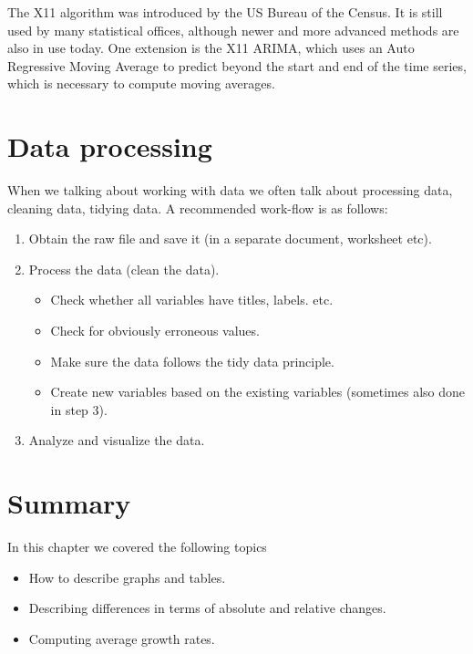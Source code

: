\documentclass[]{book}
\providecommand{\tightlist}{%
  \setlength{\itemsep}{0pt}\setlength{\parskip}{0pt}}
\begin{document}
The X11 algorithm was introduced by the US Bureau of the Census. It is still used by many statistical offices, although newer and more advanced methods are also in use today. One extension is the X11 ARIMA, which uses an Auto Regressive Moving Average to predict beyond the start and end of the time series, which is necessary to compute moving averages.

\hypertarget{data-processing}{%
\section{Data processing}\label{data-processing}}

When we talking about working with data we often talk about processing data, cleaning data, tidying data. A recommended work-flow is as follows:

\begin{enumerate}
\def\labelenumi{\arabic{enumi}.}
\item
  Obtain the raw file and save it (in a separate document, worksheet etc).
\item
  Process the data (clean the data).

  \begin{itemize}
  \tightlist
  \item
    Check whether all variables have titles, labels. etc.
  \item
    Check for obviously erroneous values.
  \item
    Make sure the data follows the tidy data principle.
  \item
    Create new variables based on the existing variables (sometimes also done in step 3).
  \end{itemize}
\item
  Analyze and visualize the data.
\end{enumerate}

\hypertarget{summary-10}{%
\section{Summary}\label{summary-10}}

In this chapter we covered the following topics

\begin{itemize}
\tightlist
\item
  How to describe graphs and tables.
\item
  Describing differences in terms of absolute and relative changes.
\item
  Computing average growth rates.
\end{itemize}
\end{document}
